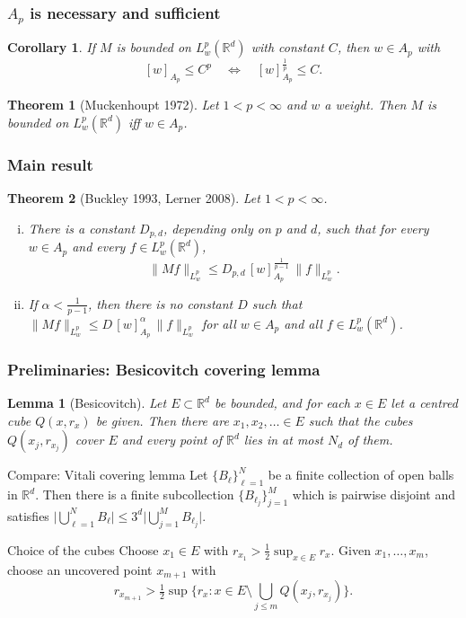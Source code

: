 \documentclass[aspectratio=1610]{beamer}
\newtheorem{corol}{Corollary} %
\newtheorem{thm}{Theorem} %
\newtheorem{lem}{Lemma} %
\begin{document}
\begin{frame}
  \frametitle{$A_p$ is necessary and sufficient}
\begin{corol}
If $M$ is bounded on $L^p_w(\mathbb{R}^d)$ with constant $C$, then $w \in A_p$ with
\[
  [w]_{A_p} \le C^p \quad\iff\quad [w]_{A_p}^{\frac{1}{p}} \le C .
\]
\end{corol}
\pause
\begin{thm}[Muckenhoupt 1972]
Let $1 < p < \infty$ and $w$ a weight. Then $M$ is bounded on $L^p_w(\mathbb{R}^d)$ iff $w \in A_p$.
\end{thm}
\end{frame}



\begin{frame}
  \frametitle{Main result}
\begin{thm}[Buckley 1993, Lerner 2008]
Let $1 < p < \infty$.
\begin{enumerate}[(i)]
  \item There is a constant $D_{p,d}$, depending only on $p$ and $d$, such that for every $w \in A_p$ and every $f \in L^p_w(\mathbb{R}^d)$,
  \[
    \|Mf\|_{L^p_w} \le D_{p,d}\, [w]_{A_p}^{\frac{1}{p-1}}\, \|f\|_{L^p_w} .
  \]
  \pause
  \item If $\alpha < \frac{1}{p-1}$, then there is no constant $D$ such that $\|Mf\|_{L^p_w} \le D\, [w]_{A_p}^{\alpha}\, \|f\|_{L^p_w}$ for all $w \in A_p$ and all $f \in L^p_w(\mathbb{R}^d)$.
\end{enumerate}
\end{thm}
\end{frame}

\begin{frame}
  \frametitle{Preliminaries: Besicovitch covering lemma}
\small
\setcounter{lem}{3}
\begin{lem}[Besicovitch]
Let $E \subset \mathbb{R}^d$ be bounded, and for each $x \in E$ let a centred cube $Q(x, r_x)$ be given. Then there are $x_1, x_2, \ldots \in E$ such that the cubes $Q(x_j, r_{x_j})$ cover $E$ and every point of $\mathbb{R}^d$ lies in at most $N_d$ of them.
\end{lem}
\pause
\vspace{-0.6em}
\begin{block}{Compare: Vitali covering lemma}
Let $\{B_\ell\}_{\ell=1}^N$ be a finite collection of open balls in $\mathbb{R}^d$. Then there is a finite subcollection $\{B_{\ell_j}\}_{j=1}^M$ which is pairwise disjoint and satisfies
$\big|\bigcup_{\ell=1}^N B_\ell\big| \le 3^d \big|\bigcup_{j=1}^M B_{\ell_j}\big|$.
\end{block}
\pause
\vspace{-0.6em}
\begin{block}{Choice of the cubes}
Choose $x_1 \in E$ with $r_{x_1} > \frac12 \sup_{x \in E} r_x$. Given $x_1, \ldots, x_m$, choose an uncovered point $x_{m+1}$ with
\vspace{-0.4em}
\[
  r_{x_{m+1}} > \tfrac12 \sup\Big\{ r_x : x \in E \setminus \bigcup_{j \le m} Q(x_j, r_{x_j}) \Big\}.
\]
\end{block}
\end{frame}
\end{document}
